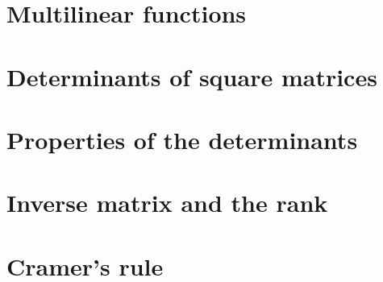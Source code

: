 
\section{Multilinear functions}
\section{Determinants of square matrices}
\section{Properties of the determinants}
\section{Inverse matrix and the rank}
\section{Cramer's rule}
